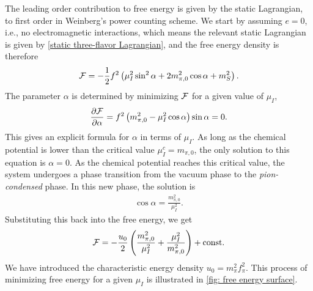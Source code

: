 The leading order contribution to free energy is given by the static Lagrangian, to first order in Weinberg's power counting scheme.
We start by assuming $e = 0$, i.e., no electromagnetic interactions, which means the relevant static Lagrangian is given by \autoref{static three-flavor Lagrangian}, and the free energy density is therefore
%
\begin{equation}
    \label{free energy pion condensate}
    \mathcal{F} 
    = 
    - \frac{1}{2} f^2
    \left(
        \mu_I^2 \sin^2\alpha
        + 2m_{\pi,0}^2 \cos\alpha
        + m_S^2
    \right).
\end{equation}
%
The parameter $\alpha$ is determined by minimizing $\mathcal{F}$ for a given value of $\mu_I$,
%
\begin{equation}
    \pdv{\mathcal{F}}{\alpha} = f^2 \left(m_{\pi,0}^2 - \mu_I^2 \cos \alpha\right) \sin\alpha = 0.
\end{equation}
%
This gives an explicit formula for $\alpha$ in terms of $\mu_I$.
As long as the chemical potential is lower than the critical value $\mu_I^c = m_{\pi,0}$, the only solution to this equation is $\alpha = 0$.
As the chemical potential reaches this critical value, the system undergoes a phase transition from the vacuum phase to the \emph{pion-condensed} phase.
In this new phase, the solution is
%
\begin{align}
    \label{alpha as function of mu lowest order}
    \cos \alpha = \frac{m_{\pi,0}^2}{\mu_I^2}.
\end{align}
%
Substituting this back into the free energy, we get
%
\begin{equation}
    \mathcal{F} 
    = - \frac{u_0}{2} \left( \frac{m_{\pi,0}^2}{\mu_I^2} + \frac{\mu_I^2}{m_{\pi,0}^2}\right) +\mathrm{const.}
\end{equation}
%
We have introduced the characteristic energy density $u_0 = m_{\pi}^2 f_\pi^2$.
This process of minimizing free energy for a given $\mu_I$ is illustrated in \autoref{fig: free energy surface}.


